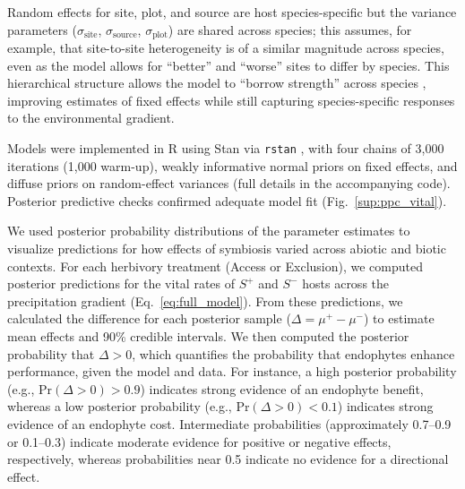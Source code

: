\documentclass[12pt]{article}\usepackage[]{graphicx}\usepackage[dvipsnames]{xcolor}
\begin{document}
Random effects for site, plot, and source are host species-specific but the variance parameters ($\sigma_{\text{site}}$, $\sigma_{\text{source}}$, $\sigma_{\text{plot}}$) are shared across species; this assumes, for example, that site-to-site heterogeneity is of a similar magnitude across species, even as the model allows for ``better'' and ``worse'' sites to differ by species. 
This hierarchical structure allows the model to ``borrow strength'' across species \citep{gelman2007data}, improving estimates of fixed effects while still capturing species-specific responses to the environmental gradient.

Models were implemented in R \citep{RCoreTeam} using Stan via \texttt{rstan} \citep{Rstan}, with four chains of 3,000 iterations (1,000 warm-up), weakly informative normal priors on fixed effects, and diffuse priors on random-effect variances (full details in the accompanying code). 
Posterior predictive checks confirmed adequate model fit (Fig.~\ref{sup:ppc_vital}).

We used posterior probability distributions of the parameter estimates to visualize predictions for how effects of symbiosis varied across abiotic and biotic contexts.
For each herbivory treatment (Access or Exclusion), we computed posterior predictions for the vital rates of $S^+$ and $S^-$ hosts across the precipitation gradient (Eq.~\ref{eq:full_model}).
From these predictions, we calculated the difference for each posterior sample ($\Delta = \mu^{+} - \mu^{-}$) to estimate mean effects and 90\% credible intervals.
We then computed the posterior probability that $\Delta > 0$, which quantifies the probability that endophytes enhance performance, given the model and data.
For instance, a high posterior probability (e.g., Pr$(\Delta>0) >0.9$) indicates strong evidence of an endophyte benefit, whereas a low posterior probability (e.g., Pr$(\Delta>0) <0.1$) indicates strong evidence of an endophyte cost.
Intermediate probabilities (approximately 0.7--0.9 or 0.1--0.3) indicate moderate evidence for positive or negative effects, respectively, whereas probabilities near 0.5 indicate no evidence for a directional effect.
\end{document}
